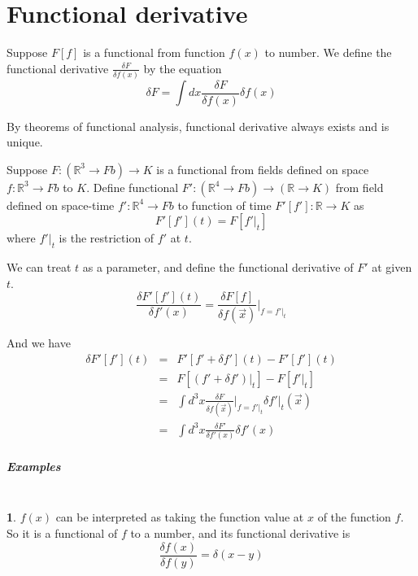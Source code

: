 \documentclass[12pt]{book}
\begin{document}
\appendix

	\chapter{Functional derivative}
	Suppose $F[f]$ is a functional from function $f(x)$ to number. We define the functional derivative $\frac{\delta F}{\delta f(x)}$ by the equation
	\begin{equation}
	\delta F=\int dx \frac{\delta F}{\delta f(x)}\delta f(x)
	\end{equation}
	
	By theorems of functional analysis, functional derivative always exists and is unique.
	
	Suppose $F:(\mathbb R^3\rightarrow Fb)\rightarrow K$ is a functional from fields defined on space $f:\mathbb R^3\rightarrow Fb$ to $K$. Define functional $F':(\mathbb R^4\rightarrow Fb)\rightarrow(\mathbb R\rightarrow K)$ from field defined on space-time $f':\mathbb R^4\rightarrow Fb$ to function of time $F'[f']:\mathbb R\rightarrow K$ as
	\begin{equation}
		F'[f'](t)=F[f'|_t]
	\end{equation}
	where $f'|_t$ is the restriction of $f'$ at $t$.
	
	We can treat $t$ as a parameter, and define the functional derivative of $F'$ at given $t$.	
	\begin{equation}
		\frac{\delta F'[f'](t)}{\delta f'(x)}=\frac{\delta F[f]}{\delta f(\vec x)}\Big|_{f=f'|_t}
	\end{equation}
	
	And we have
	\begin{eqnarray}
		\delta F'[f'](t)&=&F'[f'+\delta f'](t)-F'[f'](t)\\
		&=&F[(f'+\delta f')|_t]-F[f'|_t]\\
		&=&\int d^3x \frac{\delta F}{\delta f(\vec x)}\bigg|_{f=f'|_t}\delta f'|_t(\vec x)\\
		&=&\int d^3x \frac{\delta F'}{\delta f'(x)}\delta f'(x) \label{eqn:vari-int}
	\end{eqnarray}
	\paragraph{Examples}~ \\
	
	\textbf 1. $f(x)$ can be interpreted as taking the function value at $x$ of the function $f$. So it is a functional of $f$ to a number, and its functional derivative is
	\begin{equation}
		\frac{\delta f(x)}{\delta f(y)}=\delta(x-y)
	\end{equation}
	
\end{document}
